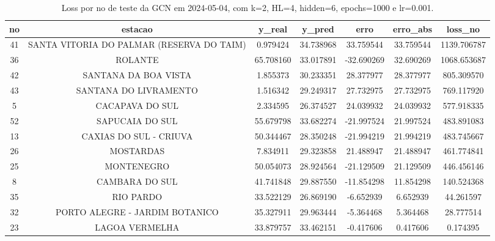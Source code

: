 \begin{table}[h]
\centering
\caption{Loss por no de teste da GCN em 2024-05-04, com k=2, HL=4, hidden=6, epochs=1000 e lr=0.001.}
\label{tab:gcn_loss_k2_hl4_h6_e1000_d20240504}
\begin{tabular}{ccccccc}
\toprule
no & estacao & y\_real & y\_pred & erro & erro\_abs & loss\_no \\
\midrule
41 & SANTA VITORIA DO PALMAR (RESERVA DO TAIM) & 0.979424 & 34.738968 & 33.759544 & 33.759544 & 1139.706787 \\
36 & ROLANTE & 65.708160 & 33.017891 & -32.690269 & 32.690269 & 1068.653687 \\
42 & SANTANA DA BOA VISTA & 1.855373 & 30.233351 & 28.377977 & 28.377977 & 805.309570 \\
43 & SANTANA DO LIVRAMENTO & 1.516342 & 29.249317 & 27.732975 & 27.732975 & 769.117920 \\
5 & CACAPAVA DO SUL & 2.334595 & 26.374527 & 24.039932 & 24.039932 & 577.918335 \\
52 & SAPUCAIA DO SUL & 55.679798 & 33.682274 & -21.997524 & 21.997524 & 483.891083 \\
13 & CAXIAS DO SUL - CRIUVA & 50.344467 & 28.350248 & -21.994219 & 21.994219 & 483.745667 \\
26 & MOSTARDAS & 7.834911 & 29.323858 & 21.488947 & 21.488947 & 461.774841 \\
25 & MONTENEGRO & 50.054073 & 28.924564 & -21.129509 & 21.129509 & 446.456146 \\
8 & CAMBARA DO SUL & 41.741848 & 29.887550 & -11.854298 & 11.854298 & 140.524368 \\
35 & RIO PARDO & 33.522129 & 26.869190 & -6.652939 & 6.652939 & 44.261597 \\
32 & PORTO ALEGRE - JARDIM BOTANICO & 35.327911 & 29.963444 & -5.364468 & 5.364468 & 28.777514 \\
23 & LAGOA VERMELHA & 33.879757 & 33.462151 & -0.417606 & 0.417606 & 0.174395 \\
\bottomrule
\end{tabular}
\end{table}
